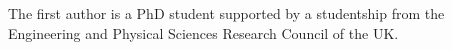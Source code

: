 \documentclass[preprint]{sigplanconf}
\begin{document}
\begin{comment}
<h3>The <tt>incrOne</tt> function</h3>

<pre class="syb">
incrOne :: Data a => Name -> Float -> a -> a
incrOne n k a | isDept n a = increase k a
              | otherwise = gmapT (incrOne n k) a

isDept :: Data a => Name -> a -> Bool
isDept n = False `mkQ` isDeptD n

isDeptD :: Name -> Dept -> Bool
isDeptD n (D n2 _ _) = n==n2
</pre>
<pre class="compos">
incrOne :: Name -> Float -> Tree c -> Tree c
incrOne d k c = case c of
    D n _ _ | n == d -> increase k c
    _ -> composOp (incrOne d k) c
</pre>
<pre class="play">
incrOne :: PlayEx x Dept => String -> Float -> x -> x
incrOne name k = mapUnderEx (\d@(D n _ _) -> if name == n then increase k d else d)
</pre>
<p>
    Here SYB has grown substantially more complex, to accomodate the invariant, requiring two different utility functions. Compos still retains the same structure as before, requiring a case to distinguish between the types of constructor. Play remains shorter - although in this case the complexity is roughly the same as the Compos solution.
</p>

<h3>The <tt>salaryBill</tt> function</h3>

<pre class="syb">
salaryBill :: Company -> Float
salaryBill = everything (+) (0 `mkQ` billS)

billS :: Salary -> Float
billS (S f) = f
</pre>
<pre class="compos">
salaryBill :: Tree c -> Float
salaryBill c = case c of
    S s -> s
    _ -> composOpFold 0 (+) salaryBill c
</pre>
<pre class="play">
salaryBill :: PlayEx x Salary => x -> Float
salaryBill x = sum [x | S x <- allOverEx x]
</pre>
<p>
    Here the Play instance wins by being able to use a list comprehension to select the salary value out of a Salary object. The Play class is the only one that is able to use the standard Haskell <tt>sum</tt> function, not requiring an explicit fold to be performed. In this case it could easily be argued that <tt>billS</tt> is probably a general function, so the cost of writting it is not really correctly attributed to the SYB approach. If <tt>billS</tt> is a generally defined function, then you can rewrite the Play example as:
</p>
<pre class="play">
salaryBill2 :: PlayEx x Salary => x -> Float
salaryBill2 = sum . map billS . allOverEx
</pre>
<p>
    This solution is nice in that it is a very specification orientated view of the problem. Take all the salaries, get their value, and sum them.
</p>



%
\end{comment}
\acks

The first author is a PhD student supported by a studentship from the Engineering and Physical Sciences Research Council of the UK.




\end{document}
